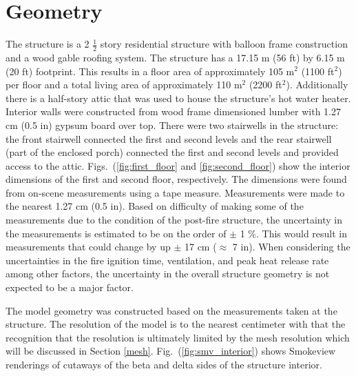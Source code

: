 \documentclass[11pt,oneside]{book}
\begin{document}
\section{Geometry}
\label{geom}
The structure is a 2 $\tfrac{1}{2}$ story residential structure with balloon frame construction and a wood gable roofing system. The structure has a 17.15 m (56 ft) by 6.15 m (20 ft) footprint. This results in a floor area of approximately 105 m$^2$ (1100 ft$^2$) per floor and a total living area of approximately 110 m$^2$ (2200 ft$^2$). Additionally there is a half-story attic that was used to house the structure's hot water heater. Interior walls were constructed from wood frame dimensioned lumber with 1.27 cm (0.5 in) gypsum board over top. There were two stairwells in the structure: the front stairwell connected the first and second levels and the rear stairwell (part of the enclosed porch) connected the first and second levels and provided access to the attic. Figs.~(\ref{fig:first_floor} and \ref{fig:second_floor}) show the interior dimensions of the first and second floor, respectively. The dimensions were found from on-scene measurements using a tape measure. Measurements were made to the nearest 1.27 cm (0.5 in). Based on difficulty of making some of the measurements due to the condition of the post-fire structure, the uncertainty in the measurements is estimated to be on the order of $\pm$ 1 \%. This would result in measurements that could change by up $\pm$ 17 cm ($\approx$ 7 in). When considering the uncertainties in the fire ignition time, ventilation, and peak heat release rate among other factors, the uncertainty in the overall structure geometry is not expected to be a major factor.

The model geometry was constructed based on the measurements taken at the structure. The resolution of the model is to the nearest centimeter with that the recognition that the resolution is ultimately limited by the mesh resolution which will be discussed in Section \ref{mesh}. Fig.~(\ref{fig:smv_interior}) shows Smokeview renderings of cutaways of the beta and delta sides of the structure interior.
\end{document}
